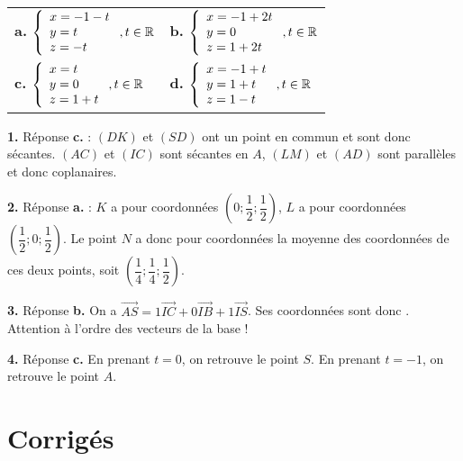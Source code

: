 \documentclass[11pt,fleqn, openany]{book} %
\begin{document}
\begin{exercise}[subtitle={(Métropole 2021)}]
\begin{enumerate}
\vskip10pt
\begin{tabularx}{\linewidth}{XX}

\textbf{a.} $\left\{\renewcommand{\arraystretch}{1}\begin{array}{l} x = -1 -t \\ y = t \\ z = -t 
\end{array}\right. , t\in \mathbb{R}$ & \textbf{b.} $\left\{\renewcommand{\arraystretch}{1}\begin{array}{l} x = -1 +2t \\ y = 0 \\ z = 1+2t \end{array}\right. , t\in \mathbb{R}$  \\ \textbf{c.} $\left\{\renewcommand{\arraystretch}{1}\begin{array}{l} x = t \\ y = 0 \\ z = 1+t \end{array}\right. , t\in \mathbb{R}$ & \textbf{d.} $\left\{\renewcommand{\arraystretch}{1}\begin{array}{l} x = -1 +t \\ y = 1+t \\ z = 1-t \end{array}\right. , t\in \mathbb{R}$ \end{tabularx}


\end{enumerate}

\end{exercise}

\begin{solution}
\textbf{1.} Réponse \textbf{c.} : $(DK)$ et $(SD)$ ont un point en commun et sont donc sécantes. $(AC)$ et $(IC)$ sont sécantes en $A$, $(LM)$ et $(AD)$ sont parallèles et donc coplanaires.

\textbf{2.} Réponse \textbf{a.} : $K$ a pour coordonnées $\left(0;\dfrac{1}{2};\dfrac{1}{2}\right)$, $L$ a pour coordonnées $\left(\dfrac{1}{2};0;\dfrac{1}{2}\right)$. Le point $N$ a donc pour coordonnées la moyenne des coordonnées de ces deux points, soit $\left(\dfrac{1}{4};\dfrac{1}{4};\dfrac{1}{2}\right)$.

\textbf{3.} Réponse \textbf{b.} On a $\overrightarrow{AS}= 1\overrightarrow{IC}+0\overrightarrow{IB}+1\overrightarrow{IS}$. Ses coordonnées sont donc \renewcommand{\arraystretch}{1}. Attention à l'ordre des vecteurs de la base !

\textbf{4.} Réponse \textbf{c.} En prenant $t=0$, on retrouve le point $S$. En prenant $t=-1$, on retrouve le point $A$.\end{solution}



\chapter{Corrigés}


\printsolutions[headings={false} ]
\end{document}
